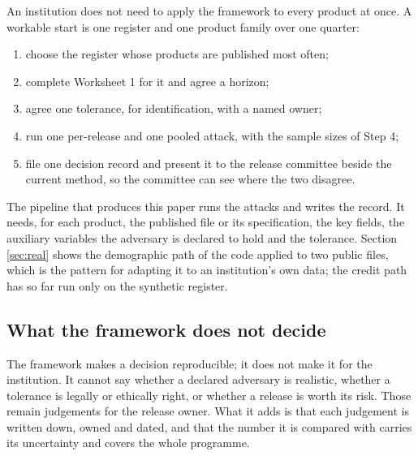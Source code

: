 An institution does not need to apply the framework to every product at once. A
workable start is one register and one product family over one quarter:
\begin{enumerate}
\item choose the register whose products are published most often;
\item complete Worksheet 1 for it and agree a horizon;
\item agree one tolerance, for identification, with a named owner;
\item run one per-release and one pooled attack, with the sample sizes of Step 4;
\item file one decision record and present it to the release committee beside the
current method, so the committee can see where the two disagree.
\end{enumerate}
The pipeline that produces this paper runs the attacks and
writes the record. It needs, for each product, the published file or its
specification, the key fields, the auxiliary variables the adversary is declared to
hold and the tolerance. Section \ref{sec:real} shows the demographic path of the
code applied to two public files, which is the pattern for adapting it to an
institution's own data; the credit path has so far run only on the synthetic
register.

\subsection{What the framework does not decide}\label{sec:apply-limits}

The framework makes a decision reproducible; it does not make it for the
institution. It cannot say whether a declared adversary is realistic, whether a
tolerance is legally or ethically right, or whether a release is worth its risk.
Those remain judgements for the release owner. What it adds is that each judgement
is written down, owned and dated, and that the number it is compared with carries
its uncertainty and covers the whole programme.
